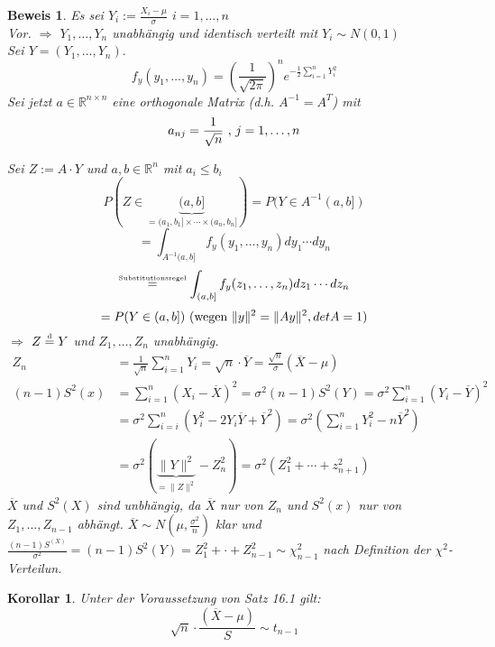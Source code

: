 \documentclass[a4paper,11pt]{book}
\newtheorem{Kor}[Sa]{Korollar}
\theoremstyle{nonumberplain}
\newtheorem{Bew}{Beweis}
\begin{document}
\begin{Bew}
Es sei $Y_i:= \frac{X_i-\mu}{\sigma}$ $i=1,\dots,n$\\
Vor. $\Rightarrow$ $Y_1,\dots,Y_n$ unabhängig und identisch verteilt mit $Y_i\sim N(0,1)$\\
Sei $Y=(Y_1,\dots,Y_n).$\\
\[f_y(y_1,\dots,y_n)=(\frac{1}{\sqrt{2\pi}})^n e^{-\frac{1}{2} \sum_{i=1}^n Y_i^2}\]
Sei jetzt $a\in\mathbb{R}^{n\times n}$ eine orthogonale Matrix (d.h. $A^{-1}=A^T$) mit 
\[a_{nj}=\frac{1}{\sqrt{n}} \textnormal{ , } j=1,\dots,n\]

Sei $Z:=A\cdot Y$ und $a,b\in\mathbb{R}^n$ mit $a_i\leq b_i$\\
\[P(Z\in\underbrace{(a,b]}_{=(a_1,b_1]\times\cdots\times (a_n,b_n]})=P(Y\in A^{-1} (a,b])\]
\[=\int_{A^{-1}(a,b]} f_y(y_1,\dots,y_n) dy_1 \cdots dy_n\]
\[ \stackrel{\text{\tiny Substitutionsregel}}{=} \int_{(a,b]} f_y(z_1,\dots,z_n) dz_1 \cdots dz_n\] 
\[ = P(Y\in(a,b]) \textnormal{ (wegen } \|y\|^2=\|Ay\|^2, detA=1 ) \]
$\Rightarrow$ $Z \stackrel{\text{\tiny d}}{=} Y$ und $Z_1,\ldots,Z_n$ unabhängig.
\begin{align*}
Z_n &= \frac1{\sqrt n} \sum_{i=1}^n Y_i  = \sqrt{n} \cdot \overline Y = \frac{\sqrt{n}}\sigma (\overline{X}-\mu) \\
(n-1) S^2(x) &= \sum_{i=1}^n (X_i - \overline X)^2 = \sigma^2(n-1) S^2(Y)=\sigma^2\sum_{i=1}^n (Y_i - \overline Y)^2 \\
&= \sigma^2 \sum_{i=i}^n (Y_i^2 - 2Y_i\overline Y + \overline Y^2) = \sigma^2 \left(\sum_{i=1}^n Y_i^2 - n\overline Y^2\right) \\
&=\sigma^2(\underbrace{\|Y\|^2}_{=\|Z\|^2} - Z_n^2) = \sigma^2(Z_1^2 + \cdots + z_{n+1}^2)
\end{align*}
$\overline X$ und $S^2(X)$ sind unbhängig, da $\overline X$ nur von $Z_n$ und $S^2(x)$ nur von $Z_1,\ldots,Z_{n-1}$ abhängt. $\overline X \sim N(\mu,\frac{\sigma^2}{n})$ klar und $\frac{(n-1)S^(X)}{\sigma^2} = (n-1)S^2(Y) = Z_1^2 + \cdot + Z_{n-1}^2 \sim \chi^2_{n-1}$ nach Definition der $\chi^2$-Verteilun.
\end{Bew}

\begin{Kor}
Unter der Voraussetzung von Satz 16.1 gilt:
\[\sqrt{n}\cdot\frac{(\overline{X}-\mu)}{S}\sim t_{n-1}\]
\end{Kor}
\end{document}
